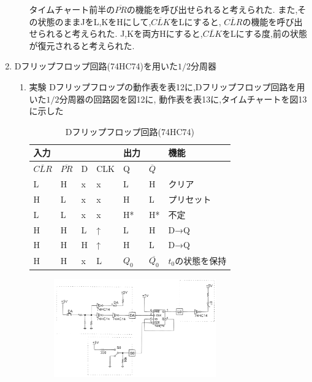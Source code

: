 \documentclass[twocolumn, 10pt,a4j]{jsarticle}
\begin{document}
\begin{enumerate}
\begin{enumerate}
            タイムチャート前半の$\overline{PR}$の機能を呼び出せられると考えられた.
            また,その状態のままJをL,KをHにして,$\overline{CLK}$をLにすると,
            $\overline{CLR}$の機能を呼び出せられると考えられた.
            J,Kを両方Hにすると,$\overline{CLK}$をLにする度,前の状態が復元されると考えられた.
        \end{enumerate}
      \item Dフリップフロップ回路(74HC74)を用いた$1/2$分周器
        \begin{enumerate}
          \item 実験
          Dフリップフロップの動作表を表12に,Dフリップフロップ回路を用いた$1/2$分周器の回路図を図12に,
          動作表を表13に,タイムチャートを図13に示した
          \begin{table}[H]
            \centering
            \caption{Dフリップフロップ回路(74HC74)}
            \label{my-label}
            \footnotesize
            \begin{tabular}{llll|ll|l}
            入力  &    &   &     & 出力 &    & 機能         \\ \hline
            $\overline{CLR}$ & $\overline{PR}$ & D & CLK & Q  & $\overline{Q}$ &            \\ \hline
            L   & H  & x & x   & L  & H  & クリア   \\
            H   & L  & x & x   & H  & L  & プリセット \\
            L   & L  & x & x   & H* & H* & 不定         \\
            H   & H  & L & ↑   & L  & H  & D→Q        \\
            H   & H  & H & ↑   & H  & L  & D→Q        \\
            H   & H  & x & L   & $Q_{0}$ & $\overline{Q_{0}}$ & $t_{0}$の状態を保持  
            \end{tabular}
          \end{table}
          \begin{figure}[H]
              \begin{center}
                \includegraphics[width=7cm]{../img/junjokairo/d_ff.png}

\end{center}
\end{figure}
\end{enumerate}
\end{enumerate}
\end{document}
